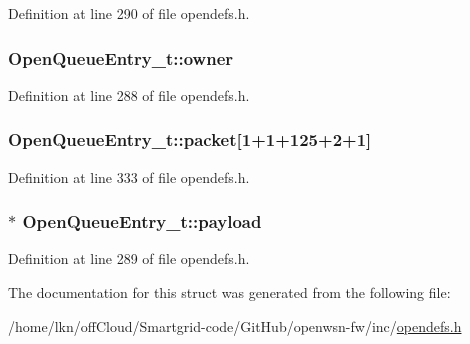 Definition at line 290 of file opendefs.\+h.

\subsubsection[{\texorpdfstring{owner}{owner}}]{ Open\+Queue\+Entry\+\_\+t\+::owner}\hypertarget{struct_open_queue_entry__t_af07aeb39aa9de8e0d4c64f0083f42935}{}\label{struct_open_queue_entry__t_af07aeb39aa9de8e0d4c64f0083f42935}


Definition at line 288 of file opendefs.\+h.

\subsubsection[{\texorpdfstring{packet}{packet}}]{ Open\+Queue\+Entry\+\_\+t\+::packet\mbox{[}1+1+125+2+1\mbox{]}}\hypertarget{struct_open_queue_entry__t_af34b0d97e707ef9084ea7e0444c4cac6}{}\label{struct_open_queue_entry__t_af34b0d97e707ef9084ea7e0444c4cac6}


Definition at line 333 of file opendefs.\+h.

\subsubsection[{\texorpdfstring{payload}{payload}}]{$\ast$ Open\+Queue\+Entry\+\_\+t\+::payload}\hypertarget{struct_open_queue_entry__t_aeeaf66f25c665e41a219c4097e5085da}{}\label{struct_open_queue_entry__t_aeeaf66f25c665e41a219c4097e5085da}


Definition at line 289 of file opendefs.\+h.



The documentation for this struct was generated from the following file\+:\begin{DoxyCompactItemize}
\item 
/home/lkn/off\+Cloud/\+Smartgrid-\/code/\+Git\+Hub/openwsn-\/fw/inc/\hyperlink{opendefs_8h}{opendefs.\+h}\end{DoxyCompactItemize}
